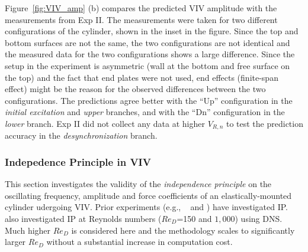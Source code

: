 Figure~\ref{fig:VIV_amp} (b) compares the predicted VIV amplitude with the
measurements from Exp II. The measurements were taken for two different
configurations of the cylinder, shown in the inset in the figure. Since the top
and bottom surfaces are not the same, the two configurations are not identical
and the measured data for the two configurations shows a large difference.
Since the setup in the experiment is asymmetric (wall at the bottom and free
surface on the top) and the fact that end plates were not used, end effects
(finite-span effect) might be the reason for the observed differences between
the two configurations. The predictions agree better with the ``Up''
configuration in the {\em initial excitation} and {\em upper} branches, and
with the ``Dn'' configuration in the {\em lower} branch. Exp II did not collect
any data at higher $V_{R,n}$ to test the prediction accuracy in the {\em
desynchronization} branch.

\subsubsection{Indepedence Principle in VIV}
\label{sec:IPinVIV}
%
This section investigates the validity of the {\em independence principle} on
the oscillating frequency, amplitude and force coefficients of an
elastically-mounted cylinder udergoing VIV. Prior experiments (e.g.,
~\citet{jain2013vortex} and \citet{franzini2013one}) have investigated IP.
\citet{zhao2015validity} also investigated IP at Reynolds numbers ($Re_D$=150
and $1,000$) using DNS. Much higher $Re_D$ is considered here and the
methodology scales to significantly larger $Re_D$ without a substantial
increase in computation cost.

